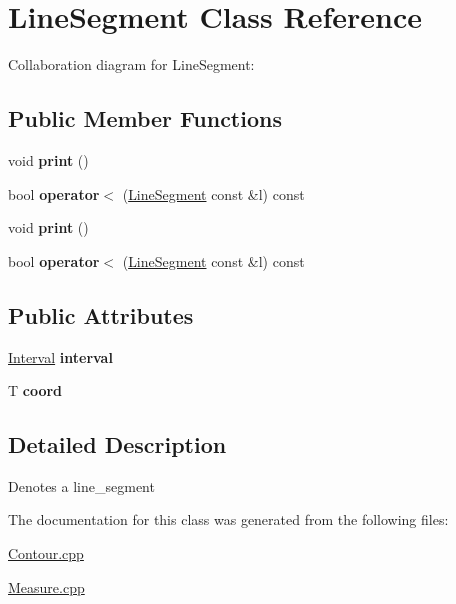 \hypertarget{classLineSegment}{}\section{Line\+Segment Class Reference}
\label{classLineSegment}


Collaboration diagram for Line\+Segment\+:
\subsection*{Public Member Functions}
\begin{DoxyCompactItemize}
\item 
\mbox{\label{classLineSegment_a8591de9a6badc3c32979851aa5603f8c}} 
void {\bfseries print} ()
\item 
\mbox{\label{classLineSegment_af19fdbc0c7381abac3f56963bba01fe6}} 
bool {\bfseries operator$<$} (\hyperlink{classLineSegment}{Line\+Segment} const \&l) const
\item 
\mbox{\label{classLineSegment_a8591de9a6badc3c32979851aa5603f8c}} 
void {\bfseries print} ()
\item 
\mbox{\label{classLineSegment_af19fdbc0c7381abac3f56963bba01fe6}} 
bool {\bfseries operator$<$} (\hyperlink{classLineSegment}{Line\+Segment} const \&l) const
\end{DoxyCompactItemize}
\subsection*{Public Attributes}
\begin{DoxyCompactItemize}
\item 
\mbox{\label{classLineSegment_a2172ca55e87808f91d9b5832527dc82b}} 
\hyperlink{classInterval}{Interval} {\bfseries interval}
\item 
\mbox{\label{classLineSegment_abb08ceb9ae3a0e3490fe3f6268ca2d1e}} 
T {\bfseries coord}
\end{DoxyCompactItemize}


\subsection{Detailed Description}
Denotes a line\+\_\+segment 

The documentation for this class was generated from the following files\+:\begin{DoxyCompactItemize}
\item 
\hyperlink{Contour_8cpp}{Contour.\+cpp}\item 
\hyperlink{Measure_8cpp}{Measure.\+cpp}\end{DoxyCompactItemize}
